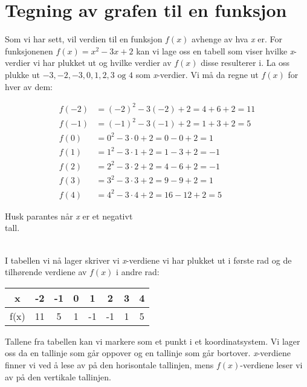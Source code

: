 \section{Tegning av grafen til en funksjon}	
Som vi har sett, vil verdien til en funksjon $ f(x) $ avhenge av hva \textit{x} er. For funksjonenen $ f(x)=x^2-3x+2 $ kan vi lage oss en tabell som viser hvilke \textit{x}-verdier vi har plukket ut og hvilke verdier av $ f(x) $ disse resulterer i. La oss plukke ut $ -3,-2,-3, 0, 1, 2, 3 \text{ og }4$ som \textit{x}-verdier. Vi må da regne ut $ f(x) $ for hver av dem:

\begin{minipage}{.75\linewidth}
\begin{align*}
f(-2) &= (-2)^2-3(-2)+2=4+6+2=11 \\
f(-1) &= (-1)^2-3(-1)+2=1+3+2=5 \\
f(0) &= 0^2-3\cdot 0+2=0-0+2=1 \\
f(1) &= 1^2-3\cdot 1+2=1-3+2=-1 \\
f(2) &= 2^2-3\cdot 2+2=4-6+2=-1 \\
f(3) &= 3^2-3\cdot 3+2=9-9+2=1 \\
f(4) &= 4^2-3\cdot 4+2=16-12+2=5
\end{align*}
\end{minipage}%
\begin{minipage}{.2\linewidth}\vspace{-70pt}
\vspace{15pt}
\begin{shaded}Husk parantes når \textit{x} er et negativt \\
tall.
\end{shaded}
\end{minipage} \\

I tabellen vi nå lager skriver vi \textit{x}-verdiene vi har plukket ut i første rad og de tilhørende verdiene av $ f(x) $ i andre rad:

\begin{center}
\begin{tabular}{ |c|c|c|c|c|c|c|c| } 
 \hline
 x & -2 & -1 & 0 & 1 & 2 & 3 & 4  \\ 
 \hline
  f(x) & 11 & 5 & 1 & -1 & -1 & 1 & 5 \\
 \hline
\end{tabular}
\end{center}

Tallene fra tabellen kan vi markere som et punkt i et koordinatsystem. Vi lager oss da en tallinje som går oppover og en tallinje som går bortover. \textit{x}-verdiene finner vi ved å lese av på den horisontale tallinjen, mens $ f(x) $-verdiene leser vi av på den vertikale tallinjen.

